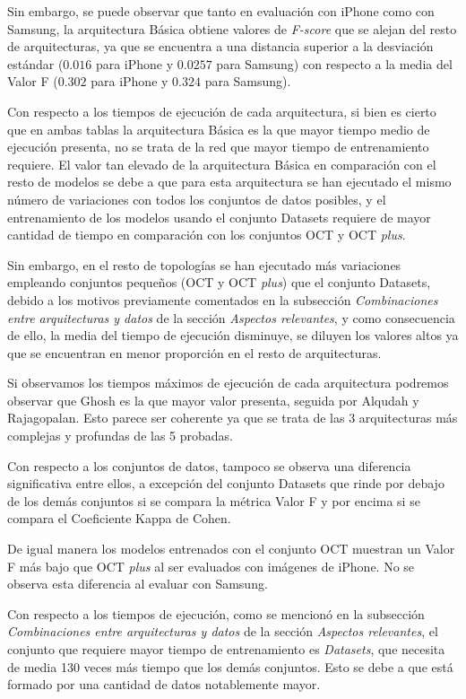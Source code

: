 Sin embargo, se puede observar que tanto en evaluación con iPhone como con Samsung, la arquitectura Básica obtiene valores de \textit{F-score} que se alejan del resto de arquitecturas, ya que se encuentra a una distancia superior a la desviación estándar ($0.016$ para iPhone y $0.0257$ para Samsung) con respecto a la media del Valor F ($0.302$ para iPhone y $0.324$ para Samsung).

Con respecto a los tiempos de ejecución de cada arquitectura, si bien es cierto que en ambas tablas la arquitectura Básica es la que mayor tiempo medio de ejecución presenta, no se trata de la red que mayor tiempo de entrenamiento requiere. El valor tan elevado de la arquitectura Básica en comparación con el resto de modelos se debe a que para esta arquitectura se han ejecutado el mismo número de variaciones con todos los conjuntos de datos posibles, y el entrenamiento de los modelos usando el conjunto Datasets requiere de mayor cantidad de tiempo en comparación con los conjuntos OCT y OCT \textit{plus}. 

Sin embargo, en el resto de topologías se han ejecutado más variaciones empleando conjuntos pequeños (OCT y OCT \textit{plus}) que el conjunto Datasets, debido a los motivos previamente comentados en la subsección \textit{Combinaciones entre arquitecturas y datos} de la sección \textit{Aspectos relevantes}, y como consecuencia de ello, la media del tiempo de ejecución disminuye, se diluyen los valores altos ya que se encuentran en menor proporción en el resto de arquitecturas.

Si observamos los tiempos máximos de ejecución de cada arquitectura podremos observar que Ghosh es la que mayor valor presenta, seguida por Alqudah y Rajagopalan. Esto parece ser coherente ya que se trata de las 3 arquitecturas más complejas y profundas de las 5 probadas.

Con respecto a los conjuntos de datos, tampoco se observa una diferencia significativa entre ellos, a excepción del conjunto Datasets que rinde por debajo de los demás conjuntos si se compara la métrica Valor F y por encima si se compara el Coeficiente Kappa de Cohen.

De igual manera los modelos entrenados con el conjunto OCT muestran un Valor F más bajo que OCT \textit{plus} al ser evaluados con imágenes de iPhone. No se observa esta diferencia al evaluar con Samsung.

Con respecto a los tiempos de ejecución, como se mencionó en la subsección \textit{Combinaciones entre arquitecturas y datos} de la sección \textit{Aspectos relevantes}, el conjunto que requiere mayor tiempo de entrenamiento es \textit{Datasets}, que necesita de media 130 veces más tiempo que los demás conjuntos. Esto se debe a que está formado por una cantidad de datos notablemente mayor.

